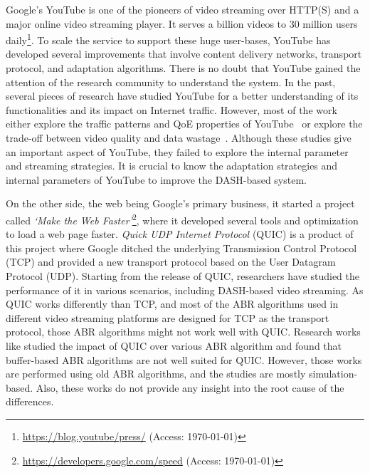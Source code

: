 Google's YouTube is one of the pioneers of video streaming over HTTP(S) and a major online video streaming player. It serves a billion videos to 30 million users daily\footnote{\url{https://blog.youtube/press/} (Access: \today)}. To scale the service to support these huge user-bases, YouTube has developed several improvements that involve content delivery networks, transport protocol, and adaptation algorithms. There is no doubt that YouTube gained the attention of the research community to understand the system. In the past, several pieces of research have studied YouTube for a better understanding of its functionalities and its impact on Internet traffic. However, most of the work either explore the traffic patterns and QoE properties of YouTube~\cite{gill2007youtube,krishnappa2013dashing,wamser2016modeling,wamser2015poster,6757893ieeeexp,7129790ieeeexp} or explore the trade-off between video quality and data wastage~\cite{sieber2015cost,seufert2015youtube,sieber2016sacrificing}. Although these studies give an important aspect of YouTube, they failed to explore the internal parameter and streaming strategies. It is crucial to know the adaptation strategies and internal parameters of YouTube to improve the DASH-based system.

On the other side, the web being Google's primary business, it started a project called \textit{`Make the Web Faster'}\footnote{\url{https://developers.google.com/speed} (Access: \today)}, where it developed several tools and optimization to load a web page faster. \textit{Quick UDP Internet Protocol} (QUIC)\cite{langley2017quic} is a product of this project where Google ditched the underlying Transmission Control Protocol (TCP) and provided a new transport protocol based on the User Datagram Protocol (UDP). Starting from the release of QUIC, researchers have studied the performance of it in various scenarios, including DASH-based video streaming. As QUIC works differently than TCP, and most of the ABR algorithms used in different video streaming platforms are designed for TCP as the transport protocol, those ABR algorithms might not work well with QUIC. Research works like \cite{bhat2018improving,van2018empirical} studied the impact of QUIC over various ABR algorithm and found that buffer-based ABR algorithms are not well suited for QUIC. However, those works are performed using old ABR algorithms, and the studies are mostly simulation-based. Also, these works do not provide any insight into the root cause of the differences.

